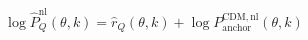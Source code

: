 \[
\log \widehat P_Q^{\mathrm{nl}}(\theta,k)=\widehat r_Q(\theta,k)+\log P_{\mathrm{anchor}}^{\mathrm{CDM,nl}}(\theta,k)
\]
